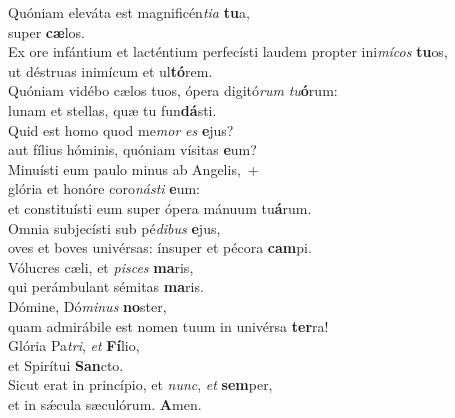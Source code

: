 \evenverse Quóniam eleváta est magnificén\textit{ti}\textit{a} \textbf{tu}a,~\*\\
\evenverse super \textbf{cæ}los.\\
\oddverse Ex ore infántium et lacténtium perfecísti laudem propter ini\textit{mí}\textit{cos} \textbf{tu}os,~\*\\
\oddverse ut déstruas inimícum et ul\textbf{tó}rem.\\
\evenverse Quóniam vidébo cælos tuos, ópera digitó\textit{rum} \textit{tu}\textbf{ó}rum:~\*\\
\evenverse lunam et stellas, quæ tu fun\textbf{dá}sti.\\
\oddverse Quid est homo quod me\textit{mor} \textit{es} \textbf{e}jus?~\*\\
\oddverse aut fílius hóminis, quóniam vísitas \textbf{e}um?\\
\evenverse Minuísti eum paulo minus ab Angelis,~+\\
\evenverse  glória et honóre coro\textit{ná}\textit{sti} \textbf{e}um:~\*\\
\evenverse et constituísti eum super ópera mánuum tu\textbf{á}rum.\\
\oddverse Omnia subjecísti sub pé\textit{di}\textit{bus} \textbf{e}jus,~\*\\
\oddverse oves et boves univérsas: ínsuper et pécora \textbf{cam}pi.\\
\evenverse Vólucres cæli, et \textit{pi}\textit{sces} \textbf{ma}ris,~\*\\
\evenverse qui perámbulant sémitas \textbf{ma}ris.\\
\oddverse Dómine, Dó\textit{mi}\textit{nus} \textbf{no}ster,~\*\\
\oddverse quam admirábile est nomen tuum in univérsa \textbf{ter}ra!\\
\evenverse Glória Pa\textit{tri}, \textit{et} \textbf{Fí}lio,~\*\\
\evenverse et Spirítui \textbf{San}cto.\\
\oddverse Sicut erat in princípio, et \textit{nunc}, \textit{et} \textbf{sem}per,~\*\\
\oddverse et in sǽcula sæculórum. \textbf{A}men.\\
